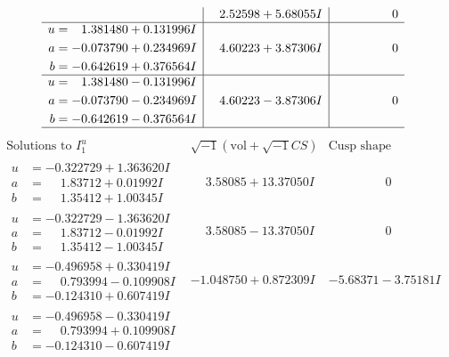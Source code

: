 \documentclass[1p]{elsarticle_modified}
\theoremstyle{definition}
\newcommand{\I}{\sqrt{-1}}
\begin{document}
$$\begin{array}{c|c|c}
 & \phantom{-}2.52598 + 5.68055 I & \phantom{-0.000000 } 0 \\ \hline\begin{aligned}
u &= \phantom{-}1.381480 + 0.131996 I \\
a &= -0.073790 + 0.234969 I \\
b &= -0.642619 + 0.376564 I\end{aligned}
 & \phantom{-}4.60223 + 3.87306 I & \phantom{-0.000000 } 0 \\ \hline\begin{aligned}
u &= \phantom{-}1.381480 - 0.131996 I \\
a &= -0.073790 - 0.234969 I \\
b &= -0.642619 - 0.376564 I\end{aligned}
 & \phantom{-}4.60223 - 3.87306 I & \phantom{-0.000000 } 0\\
 \hline 
 \end{array}$$\newpage$$\begin{array}{c|c|c}  
\text{Solutions to }I^u_{1}& \I (\text{vol} + \sqrt{-1}CS) & \text{Cusp shape}\\
 \hline 
\begin{aligned}
u &= -0.322729 + 1.363620 I \\
a &= \phantom{-}1.83712 + 0.01992 I \\
b &= \phantom{-}1.35412 + 1.00345 I\end{aligned}
 & \phantom{-}3.58085 + 13.37050 I & \phantom{-0.000000 } 0 \\ \hline\begin{aligned}
u &= -0.322729 - 1.363620 I \\
a &= \phantom{-}1.83712 - 0.01992 I \\
b &= \phantom{-}1.35412 - 1.00345 I\end{aligned}
 & \phantom{-}3.58085 - 13.37050 I & \phantom{-0.000000 } 0 \\ \hline\begin{aligned}
u &= -0.496958 + 0.330419 I \\
a &= \phantom{-}0.793994 - 0.109908 I \\
b &= -0.124310 + 0.607419 I\end{aligned}
 & -1.048750 + 0.872309 I & -5.68371 - 3.75181 I \\ \hline\begin{aligned}
u &= -0.496958 - 0.330419 I \\
a &= \phantom{-}0.793994 + 0.109908 I \\
b &= -0.124310 - 0.607419 I\end{aligned}

\end{array}$$
\end{document}
